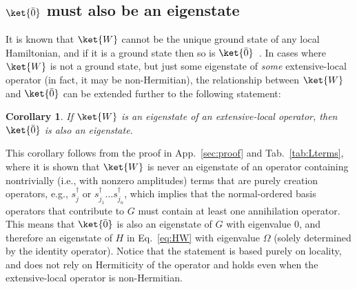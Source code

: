 \documentclass[prx,letterpaper,aps,superscriptaddress,floatfix,twocolumn,nofootinbib]{revtex4-2}
\newtheorem{cor}{Corollary}
\theoremstyle{definition}
\begin{document}
\subsection{$\ket{\bar{0}}$ must also be an eigenstate}
%
It is known that $\ket{W}$ cannot be the unique ground state of any local Hamiltonian, and if it is a ground state then so is $\ket{\bar{0}}$~\cite{gioia2024wstateuniqueground}.
%
In cases where $\ket{W}$ is not a ground state, but just some eigenstate of \textit{some} extensive-local operator (in fact, it may be non-Hermitian), the relationship between $\ket{W}$ and $\ket{\bar{0}}$ can be extended further to the following statement:
\begin{cor}
\label{cor:W0deg}
If $\ket{W}$ is an eigenstate of an extensive-local operator, then $\ket{\bar{0}}$ is also an eigenstate.
\end{cor}
This corollary follows from the proof in App.~\ref{sec:proof} and Tab.~\ref{tab:Lterms}, where it is shown that $\ket{W}$ is never an eigenstate of an operator containing nontrivially (i.e., with nonzero amplitudes) terms that are purely creation operators, e.g., $s_j^\dag$ or $s_{j_1}^\dag \dots s_{j_n}^\dag$, which implies that the normal-ordered basis operators that contribute to $G$ must contain at least one annihilation operator.
%
This means that $\ket{\bar{0}}$ is also an eigenstate of $G$ with eigenvalue $0$, and therefore an eigenstate of $H$ in Eq.~\eqref{eq:HW} with eigenvalue $\Omega$ (solely determined by the identity operator).
%
Notice that the statement is based purely on locality, and does not rely on Hermiticity of the operator and holds even when the extensive-local operator is non-Hermitian.
%
\end{document}
